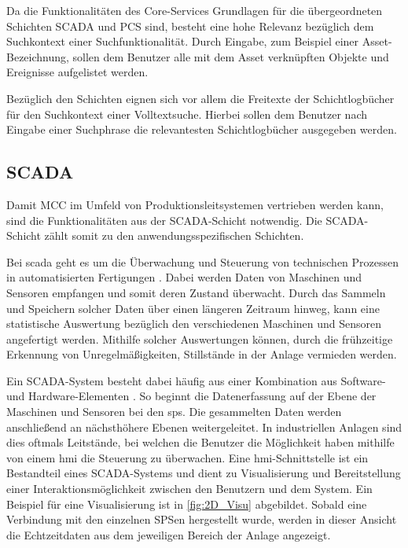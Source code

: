 Da die Funktionalitäten des Core-Services Grundlagen für die übergeordneten Schichten \glqq SCADA\grqq{} und \glqq PCS\grqq{} sind, besteht eine hohe Relevanz bezüglich dem Suchkontext einer Suchfunktionalität. Durch Eingabe, zum Beispiel einer Asset-Bezeichnung, sollen dem Benutzer alle mit dem Asset verknüpften Objekte und Ereignisse aufgelistet werden.

Bezüglich den Schichten eignen sich vor allem die Freitexte der Schichtlogbücher für den Suchkontext einer Volltextsuche. Hierbei sollen dem Benutzer nach Eingabe einer Suchphrase die relevantesten Schichtlogbücher ausgegeben werden.

\subsection{SCADA\label{subsec3.1.3:Unterunterpunkt-3}}

Damit MCC im Umfeld von Produktionsleitsystemen vertrieben werden kann, sind die Funktionalitäten aus der \glqq SCADA\grqq{}-Schicht notwendig. Die \glqq SCADA\grqq{}-Schicht zählt somit zu den anwendungsspezifischen Schichten.

Bei \gls{scada} geht es um die Überwachung und Steuerung von technischen Prozessen in automatisierten Fertigungen \cite{ColeWangsness.2020}. Dabei werden Daten von Maschinen und Sensoren empfangen und somit deren Zustand überwacht. Durch das Sammeln und Speichern solcher Daten über einen längeren Zeitraum hinweg, kann eine statistische Auswertung bezüglich den verschiedenen Maschinen und Sensoren angefertigt werden. Mithilfe solcher Auswertungen können, durch die frühzeitige Erkennung von Unregelmäßigkeiten, Stillstände in der Anlage vermieden werden.

Ein SCADA-System besteht dabei häufig aus einer Kombination aus Software- und Hardware-Elementen \cite{copadata.com.2021}. So beginnt die Datenerfassung auf der Ebene der Maschinen und Sensoren bei den \gls{sps}. Die gesammelten Daten werden anschließend an nächsthöhere Ebenen weitergeleitet. In industriellen Anlagen sind dies oftmals Leitstände, bei welchen die Benutzer die Möglichkeit haben mithilfe von einem \gls{hmi} die Steuerung zu überwachen. Eine \gls{hmi}-Schnittstelle ist ein Bestandteil eines SCADA-Systems und dient zu Visualisierung und Bereitstellung einer Interaktionsmöglichkeit zwischen den Benutzern und dem System. Ein Beispiel für eine Visualisierung ist in \autoref{fig:2D_Visu} abgebildet. Sobald eine Verbindung mit den einzelnen SPSen hergestellt wurde, werden in dieser Ansicht die Echtzeitdaten aus dem jeweiligen Bereich der Anlage angezeigt.

